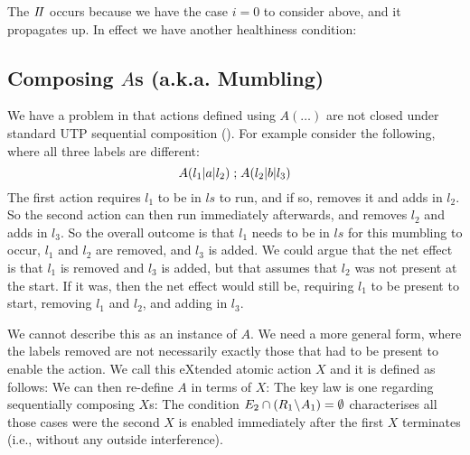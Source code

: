 The $I\!I$ occurs because we have the case $i=0$ to consider above,
and it propagates up.
In effect we have another healthiness condition:


\subsection{Composing $A$s (a.k.a. Mumbling)}\label{ssec:comp-A}

We have a problem in that actions defined using $A(\dots)$
are not closed under standard UTP sequential composition ().
For example consider the following,
where all three labels are different:
\[
   A(l_1|a|l_2) \mathrel{;} A(l_2|b|l_3)
\]
The first action requires $l_1$ to be in $ls$ to run,
and if so, removes it and adds in $l_2$.
So the second action can then run immediately afterwards,
and removes $l_2$ and adds in $l_3$.
So the overall outcome is that $l_1$ needs to be in $ls$
for this mumbling to occur, $l_1$ and $l_2$ are removed,
and $l_3$ is added.
We could argue that the net effect is that $l_1$
is removed and $l_3$ is added,
but that assumes that $l_2$ was not present at the start.
If it was, then the net effect would still be,
requiring $l_1$ to be present to start,
removing $l_1$ and $l_2$, and adding in $l_3$.

We cannot describe this as an instance of $A$.
We need a more general form,
where the labels removed are not necessarily
exactly those that had to be present to enable the action.
We call this eXtended atomic action $X$ and it is defined as follows:
We can then re-define $A$ in terms of $X$:
The key law is one regarding sequentially composing $X$s:
The condition $E_2 \cap (R_1\!\setminus\! A_1) = \emptyset$
characterises all those cases were the second $X$ is enabled
immediately after the first $X$ terminates
(i.e., without any outside interference).

